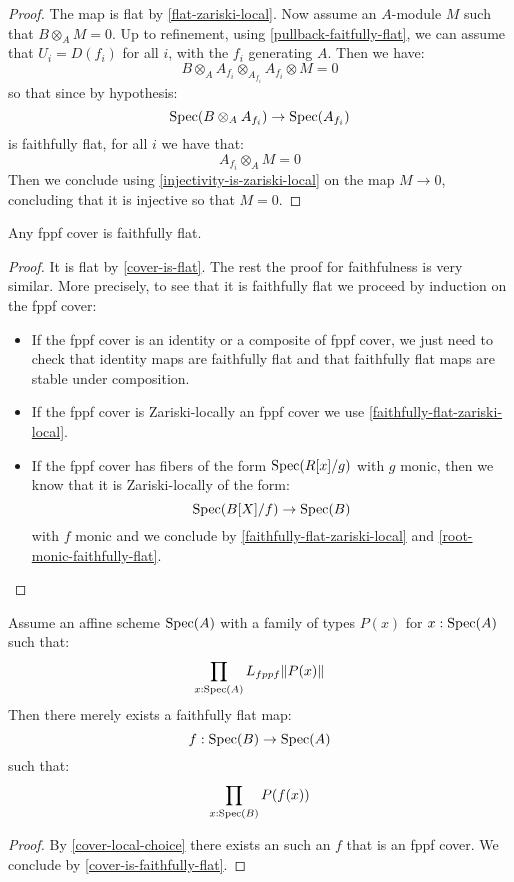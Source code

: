 \begin{proof}
The map is flat by \cref{flat-zariski-local}. Now assume an $A$-module $M$ such that $B\otimes_AM=0$. Up to refinement, using \cref{pullback-faitfully-flat}, we can assume that $U_i = D(f_i)$ for all $i$, with the $f_i$ generating $A$. Then we have:
\[B\otimes_AA_{f_i}\otimes_{A_{f_i}}A_{f_i}\otimes M = 0\]
so that since by hypothesis:
\[\operatorname{Spec}(B\otimes_AA_{f_i}) \to \operatorname{Spec}(A_{f_i})\]
is faithfully flat, for all $i$ we have that:
\[A_{f_i}\otimes_A M = 0\]
Then we conclude using \cref{injectivity-is-zariski-local} on the map $M\to 0$, concluding that it is injective so that $M=0$.
\end{proof}

\begin{proposition}\label{cover-is-faithfully-flat}
Any fppf cover is faithfully flat.
\end{proposition}

\begin{proof}
It is flat by \cref{cover-is-flat}. The rest the proof for faithfulness is very similar. More precisely, to see that it is faithfully flat we proceed by induction on the fppf cover:
\begin{itemize}
\item If the fppf cover is an identity or a composite of fppf cover, we just need to check that identity maps are faithfully flat and that faithfully flat maps are stable under composition.
\item If the fppf cover is Zariski-locally an fppf cover we use \cref{faithfully-flat-zariski-local}.
\item If the fppf cover has fibers of the form $\operatorname{Spec}(R[x]/g)$ with $g$ monic, then we know that it is Zariski-locally of the form:
\[\operatorname{Spec}(B[X]/f)\to \operatorname{Spec}(B)\]
with $f$ monic and we conclude by \cref{faithfully-flat-zariski-local} and \cref{root-monic-faithfully-flat}.
\end{itemize}
\end{proof}

\begin{lemma}\label{faithfully-flat-choice}
Assume an affine scheme $\operatorname{Spec}(A)$ with a family of types $P(x)$ for $x:\operatorname{Spec}(A)$ such that:
\[\prod_{x:\operatorname{Spec}(A)}L_{fppf}\lVert P(x) \rVert\]
Then there merely exists a faithfully flat map:
\[f:\operatorname{Spec}(B)\to\operatorname{Spec}(A)\]
such that:
\[\prod_{x:\operatorname{Spec}(B)}P(f(x))\]
\end{lemma}

\begin{proof}
By \cref{cover-local-choice} there exists an such an $f$ that is an fppf cover. We conclude by \cref{cover-is-faithfully-flat}.
\end{proof}

